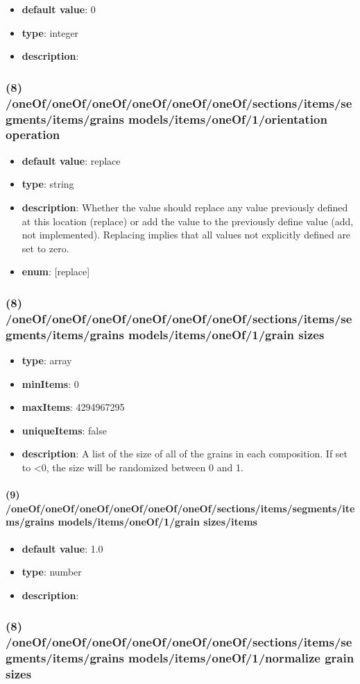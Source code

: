 \begin{itemize}[leftmargin=9em]\item {\bf default value}: 0
\item {\bf type}: integer
\item {\bf description}: 
\end{itemize}\subsubsection{(8) /oneOf/oneOf/oneOf/oneOf/oneOf/oneOf/sections/items/segments/items/grains models/items/oneOf/1/orientation operation}
\begin{itemize}[leftmargin=8em]\item {\bf default value}: replace
\item {\bf type}: string
\item {\bf description}: Whether the value should replace any value previously defined at this location (replace) or add the value to the previously define value (add, not implemented). Replacing implies that all values not explicitly defined are set to zero.
\item {\bf enum}: [replace]\end{itemize}\subsubsection{(8) /oneOf/oneOf/oneOf/oneOf/oneOf/oneOf/sections/items/segments/items/grains models/items/oneOf/1/grain sizes}
\begin{itemize}[leftmargin=8em]\item {\bf type}: array
\item {\bf minItems}: 0
\item {\bf maxItems}: 4294967295
\item {\bf uniqueItems}: false
\item {\bf description}: A list of the size of all of the grains in each composition. If set to <0, the size will be randomized between 0 and 1.
\end{itemize}\paragraph{(9) /oneOf/oneOf/oneOf/oneOf/oneOf/oneOf/sections/items/segments/items/grains models/items/oneOf/1/grain sizes/items}
\begin{itemize}[leftmargin=9em]\item {\bf default value}: 1.0
\item {\bf type}: number
\item {\bf description}: 
\end{itemize}\subsubsection{(8) /oneOf/oneOf/oneOf/oneOf/oneOf/oneOf/sections/items/segments/items/grains models/items/oneOf/1/normalize grain sizes}
